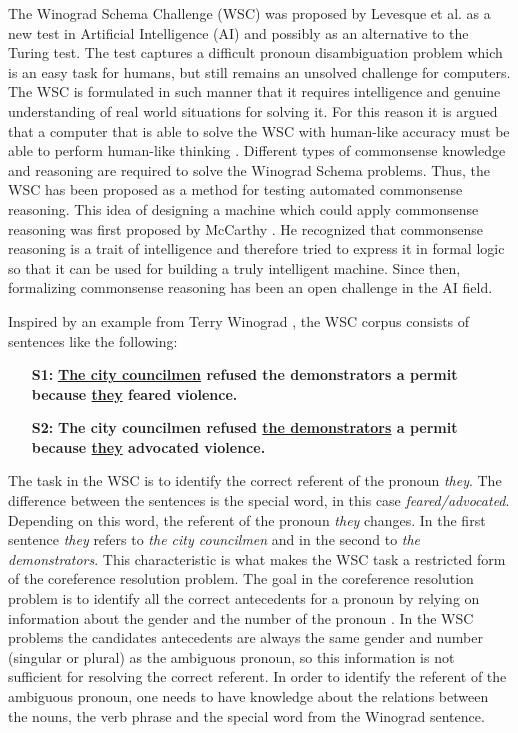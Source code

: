 \label{section:introduction}

The Winograd Schema Challenge (WSC) was proposed by Levesque et al. \cite{DBLP:conf/kr/LevesqueDM12} as a new test in Artificial Intelligence (AI) and possibly as an alternative to the Turing test. The test captures a difficult pronoun disambiguation problem which is an easy task for humans, but still remains an unsolved challenge for computers. The WSC is formulated in such manner that it requires intelligence and genuine understanding of real world situations for solving it. For this reason it is argued that a computer that is able to solve the WSC with human-like accuracy must be able to perform human-like thinking \cite{DBLP:conf/kr/LevesqueDM12}. 
Different types of commonsense knowledge and reasoning are required to solve the Winograd Schema problems. Thus, the WSC has been proposed as a method for testing automated commonsense reasoning. This idea of designing a  machine which could apply commonsense reasoning was first proposed by McCarthy \cite{McCarthy:1960:PCS:889202}. He recognized that commonsense reasoning is a trait of intelligence and therefore tried to express it in formal logic so that it can be used for building a truly intelligent machine. Since then, formalizing commonsense reasoning has been an open challenge in the AI field.   

Inspired by an example from Terry Winograd \cite{article}, the WSC corpus consists of sentences like the following:
\begin{itemize}
	\item[\textbf{S1:}] \textbf{\underline{The city councilmen} refused the demonstrators a permit because \underline{they} feared violence.}
	\item[\textbf{S2:}] \textbf{The city councilmen refused \underline{the demonstrators} a permit because \underline{they} advocated violence.}
\end{itemize}

The task in the WSC is to identify the correct referent of the pronoun \textit{they}. The difference between the sentences is the special word, in this case \textit{feared/advocated}. Depending on this word, the referent of the pronoun \textit{they} changes. In the first sentence \textit{they} refers to \textit{the city councilmen} and in the second to \textit{the demonstrators}. This characteristic is what makes the WSC task a restricted form of the coreference resolution problem. The goal in the coreference resolution problem is to identify all the correct antecedents for a pronoun by relying on information about the gender and the number of the pronoun \cite{Coref}. In the WSC problems the candidates antecedents are always the same gender and number (singular or plural) as the ambiguous pronoun, so this information is not sufficient for resolving the correct referent.
In order to identify the referent of the ambiguous pronoun, one needs to have knowledge about the relations between the nouns, the verb phrase and the special word from the Winograd sentence.

